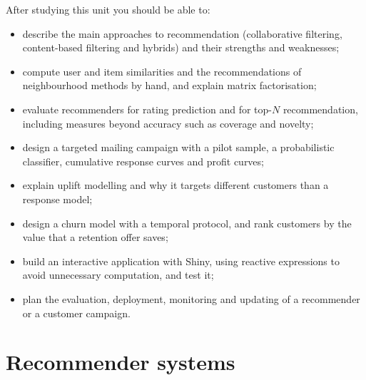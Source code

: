 \begin{objectives}
After studying this unit you should be able to:
\begin{itemize}
  \item describe the main approaches to recommendation (collaborative filtering, content-based filtering and
        hybrids) and their strengths and weaknesses;
  \item compute user and item similarities and the recommendations of neighbourhood methods by hand, and
        explain matrix factorisation;
  \item evaluate recommenders for rating prediction and for top-$N$ recommendation, including measures beyond
        accuracy such as coverage and novelty;
  \item design a targeted mailing campaign with a pilot sample, a probabilistic classifier, cumulative response
        curves and profit curves;
  \item explain uplift modelling and why it targets different customers than a response model;
\item design a churn model with a temporal protocol, and rank customers by the value that a retention
offer saves;
  \item build an interactive application with Shiny, using reactive expressions to avoid unnecessary computation,
        and test it;
\item plan the evaluation, deployment, monitoring and updating of a recommender or a customer campaign.
\end{itemize}
\end{objectives}

\section{Recommender systems}\label{sec:recsys}

